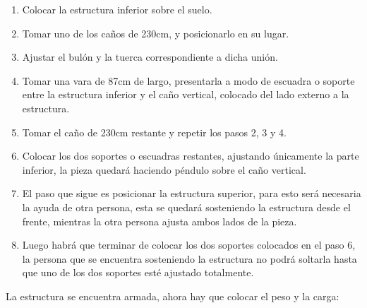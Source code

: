         \begin{enumerate}
            \item Colocar la estructura inferior sobre el suelo.
            \item Tomar uno de los caños de 230cm, y posicionarlo en su lugar.
            \item Ajustar el bulón y la tuerca correspondiente a dicha unión.
            \item Tomar una vara de 87cm de largo, presentarla a modo de escuadra o soporte entre la estructura inferior y el caño vertical, colocado del lado externo a la estructura.
            \item Tomar el caño de 230cm restante y repetir los pasos 2, 3 y 4.
            \item Colocar los dos soportes o escuadras restantes, ajustando únicamente la parte inferior, la pieza quedará haciendo péndulo sobre el caño vertical.
            \item El paso que sigue es posicionar la estructura superior, para esto será necesaria la ayuda de otra persona, esta se quedará sosteniendo la estructura desde el frente, mientras la otra persona ajusta ambos lados de la pieza.
            \item Luego habrá que terminar de colocar los dos soportes colocados en el paso 6, la persona que se encuentra sosteniendo la estructura no podrá soltarla hasta que uno de los dos soportes esté ajustado totalmente.
        \end{enumerate}
        
        La estructura se encuentra armada, ahora hay que colocar el peso y la carga:\par

